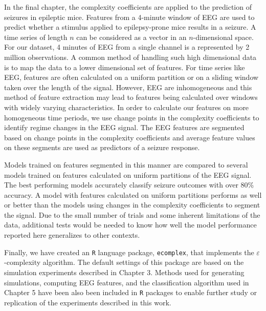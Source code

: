 In the final chapter, the complexity coefficients are applied
to the prediction of seizures in epileptic mice. Features from a 4-minute window of EEG are used to predict whether a stimulus
applied to epilepsy-prone mice results in a seizure. 
A time series of length $n$ can be considered as a vector in an $n$-dimensional space. For our dataset, 4 minutes of 
EEG from a single channel is a represented by 2 million observations.
A common method of handling such high dimensional data is to map the data to a lower dimensional set of features. For time series like EEG, features are often calculated 
on a uniform partition or on a sliding
window taken over the length of the signal. However, EEG are  
inhomogeneous and this method of 
feature extraction may lead to features being calculated over
windows with widely varying characteristics.
In order to calculate our features on more homogeneous time periods, we use change points in the complexity coefficients to identify regime changes in the EEG signal. The EEG features are segmented based on change points in the complexity 
coefficients and average feature values on these segments are used as predictors of a seizure response. 

Models trained on features segmented in this manner are compared to several models trained on features calculated on uniform partitions of the EEG signal. 
The best performing models accurately classify seizure outcomes with over 80\% accuracy. A model with features calculated on uniform partitions performs 
as well or better than the models using changes in the complexity
coefficients to segment the signal.
Due to the small number of trials and some inherent limitations 
of the data, additional tests would be needed to 
know how well the model performance reported here generalizes
to other contexts.


Finally, we have created an \texttt{R} language package, 
\texttt{ecomplex}, that implements 
the $\varepsilon$-complexity algorithm\cite{aff2017}. The 
default settings of this package are based on the simulation 
experiments described in Chapter 3. Methods used 
for generating simulations, computing EEG features, 
and the classification algorithm used in Chapter 5 
have been also been included in \texttt{R} 
packages to enable further study or replication of
the experiments described in this work.


